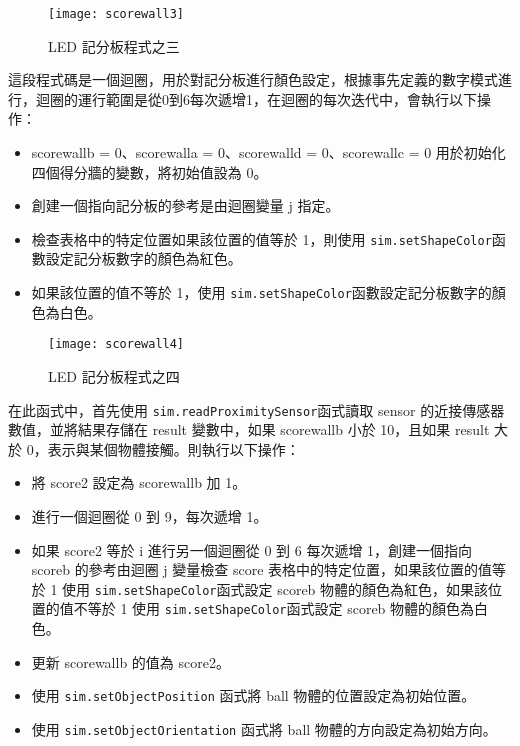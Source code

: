 \begin{figure}[hbt!]
\begin{center}
\texttt{[image: scorewall3]}
\caption{\Large LED 記分板程式之三}\label{LED 記分板程式之三}
\end{center}
\end{figure}
這段程式碼是一個迴圈，用於對記分板進行顏色設定，根據事先定義的數字模式進行，迴圈的運行範圍是從0到6每次遞增1，在迴圈的每次迭代中，會執行以下操作：
\begin{itemize}
\item scorewallb = 0、scorewalla = 0、scorewalld = 0、scorewallc = 0 用於初始化四個得分牆的變數，將初始值設為 0。\\
\item 創建一個指向記分板的參考是由迴圈變量 j 指定。\\
\item 檢查表格中的特定位置如果該位置的值等於 1，則使用 \texttt{sim.setShapeColor}函數設定記分板數字的顏色為紅色。\\
\item 如果該位置的值不等於 1，使用 \texttt{sim.setShapeColor}函數設定記分板數字的顏色為白色。\\
\end{itemize}

\begin{figure}[hbt!]
\begin{center}
\texttt{[image: scorewall4]}
\caption{\Large LED 記分板程式之四}\label{LED 記分板程式之四}
\end{center}
\end{figure} 
在此函式中，首先使用 \texttt{sim.readProximitySensor}函式讀取 sensor 的近接傳感器數值，並將結果存儲在 result 變數中，如果 scorewallb 小於 10，且如果 result 大於 0，表示與某個物體接觸。則執行以下操作：\\
\begin{itemize}
\item 將 score2 設定為 scorewallb 加 1。\\
\item 進行一個迴圈從 0 到 9，每次遞增 1。\\
\item 如果 score2 等於 i 進行另一個迴圈從 0 到 6 每次遞增 1，創建一個指向 scoreb 的參考由迴圈 j 變量檢查 score 表格中的特定位置，如果該位置的值等於 1 使用 \texttt{sim.setShapeColor}函式設定 scoreb 物體的顏色為紅色，如果該位置的值不等於 1 使用 \texttt{sim.setShapeColor}函式設定 scoreb 物體的顏色為白色。\\
\item 更新 scorewallb 的值為 score2。\\
\item 使用 \texttt{sim.setObjectPosition} 函式將 ball 物體的位置設定為初始位置。\\
\item 使用 \texttt{sim.setObjectOrientation} 函式將 ball 物體的方向設定為初始方向。\\
\end{itemize}

